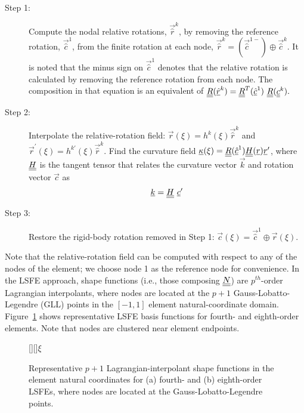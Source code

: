 \begin{description}

    \item[Step 1:] Compute the nodal relative rotations, $\vec{\hat{r}}^k$,
by removing the reference rotation, $\vec{\hat{c}}^1$, from the finite
rotation at each node, $\vec{\hat{r}}^k = (\vec{\hat{c}}^{1-}) \oplus
\vec{\hat{c}}^k$. It is noted that the minus sign on $\vec{\hat{c}}^1$ denotes that the relative rotation is calculated by removing the reference rotation from each node.  The composition in that equation is an equivalent of $\underline{\underline{R}}(\underline{\hat{r}}^k) = \underline{\underline{R}}^T(\underline{\hat{c}}^1)~\underline{\underline{R}}(\underline{\underline{c}}^k).$

    \item[Step 2:] Interpolate the relative-rotation field: $\vec{r}(\xi) = h^k(\xi) \vec{\hat{r}}^k$ and $\vec{r}^\prime(\xi) = h^{k \prime}(\xi) \vec{\hat{r}}^k$. Find the curvature field $\underline{\kappa}(\xi) = \underline{\underline{R}}(\underline{\hat{c}}^1) \underline{\underline{H}}(\underline{r}) \underline{r}^\prime$, where $\underline{\underline{H}}$ is the tangent tensor that relates the curvature vector $\vec{k}$ and rotation vector $\vec{c}$ as
\begin{equation}
    \label{Tensor}
    \underline{k} = \underline{\underline{H}}~ \underline{c}^\prime
\end{equation}

    \item[Step 3:] Restore the rigid-body rotation removed in Step 1: $\vec{c}(\xi) = \vec{\hat{c}}^1 \oplus \vec{r}(\xi)$.
\end{description} 


Note that the relative-rotation field can be computed with respect to any of the nodes of the element; we choose node 1 as the reference node for convenience. 
In the LSFE approach, shape functions (i.e., those composing $\underline{\underline{N}}$) are $p^{th}$-order Lagrangian interpolants, where nodes are located at the $p+1$ Gauss-Lobatto-Legendre (GLL) points in the $[-1,1]$ element natural-coordinate domain.  
Figure~\ref{fig:N4_lsfe} shows representative LSFE basis functions for  fourth- and eighth-order elements. 
Note that nodes are clustered near element endpoints.

\begin{figure}[h]
    \centering
    [][]{$\xi$}
    \caption{Representative $p+1$ Lagrangian-interpolant shape functions in the element natural coordinates for (a) fourth- and (b) eighth-order LSFEs, where nodes are located at the Gauss-Lobatto-Legendre points.}
    \label{fig:N4_lsfe}
\end{figure}

